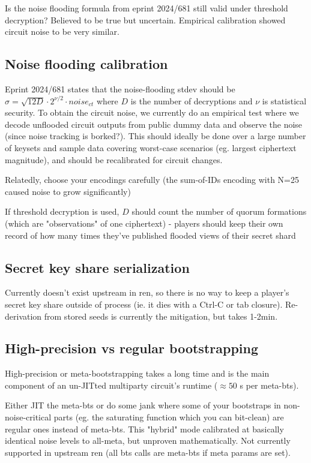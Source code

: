 \documentclass{article}
\begin{document}
Is the noise flooding formula from eprint 2024/681 still valid under threshold decryption? 
Believed to be true but uncertain.
Empirical calibration showed circuit noise to be very similar.

\subsection{Noise flooding calibration}
Eprint 2024/681 states that the noise-flooding stdev should be $\sigma = \sqrt{12D} \cdot 2^{\nu/2} \cdot noise_{ct}$ where $D$ is the number of decryptions and $\nu$ is statistical security.
To obtain the circuit noise, we currently do an empirical test where we decode unflooded circuit outputs from public dummy data and observe the noise (since noise tracking is borked?).
This should ideally be done over a large number of keysets and sample data covering worst-case scenarios (eg. largest ciphertext magnitude), and should be recalibrated for circuit changes.

Relatedly, choose your encodings carefully (the sum-of-IDs encoding with N=25 caused noise to grow significantly)

If threshold decryption is used, $D$ should count the number of quorum formations (which are "observations" of one ciphertext) - players should keep their own record of how many times they've published flooded views of their secret shard

\subsection{Secret key share serialization}
Currently doesn't exist upstream in ren, so there is no way to keep a player's secret key share outside of process (ie. it dies with a Ctrl-C or tab closure).
Re-derivation from stored seeds is currently the mitigation, but takes 1-2min.

\subsection{High-precision vs regular bootstrapping}
High-precision or meta-bootstrapping takes a long time and is the main component of an un-JITted multiparty circuit's runtime ($\approx 50$ s per meta-bts).

Either JIT the meta-bts or do some jank where some of your bootstraps in non-noise-critical parts (eg. the saturating function which you can bit-clean) are regular ones instead of meta-bts. 
This "hybrid" mode calibrated at basically identical noise levels to all-meta, but unproven mathematically. 
Not currently supported in upstream ren (all bts calls are meta-bts if meta params are set).
\end{document}
